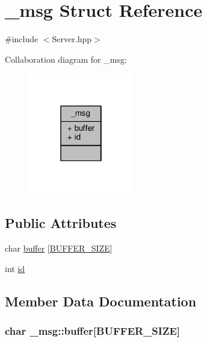 \hypertarget{struct__msg}{}\section{\+\_\+msg Struct Reference}
\label{struct__msg}


{\ttfamily \#include $<$Server.\+hpp$>$}



Collaboration diagram for \+\_\+msg\+:\nopagebreak
\begin{figure}[H]
\begin{center}
\leavevmode
\includegraphics[width=130pt]{struct__msg__coll__graph}
\end{center}
\end{figure}
\subsection*{Public Attributes}
\begin{DoxyCompactItemize}
\item 
char \hyperlink{struct__msg_a470db8b42735763fc80e93590da2eaf4}{buffer} \mbox{[}\hyperlink{__data_8hpp_a6b20d41d6252e9871430c242cb1a56e7}{B\+U\+F\+F\+E\+R\+\_\+\+S\+I\+Z\+E}\mbox{]}
\item 
int \hyperlink{struct__msg_a5319cda008478b61e06ddf06c2cf166e}{id}
\end{DoxyCompactItemize}


\subsection{Member Data Documentation}
\hypertarget{struct__msg_a470db8b42735763fc80e93590da2eaf4}{}
\subsubsection[{buffer}]{\setlength{\rightskip}{0pt plus 5cm}char \+\_\+msg\+::buffer\mbox{[}{\bf B\+U\+F\+F\+E\+R\+\_\+\+S\+I\+Z\+E}\mbox{]}}\label{struct__msg_a470db8b42735763fc80e93590da2eaf4}
\hypertarget{struct__msg_a5319cda008478b61e06ddf06c2cf166e}{}

